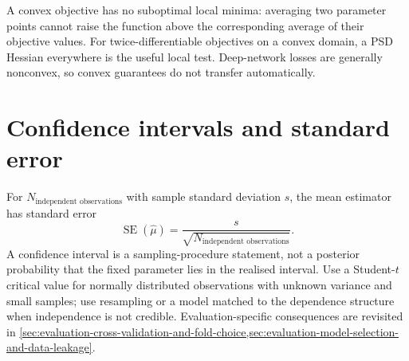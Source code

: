 A convex objective has no suboptimal local minima: averaging two parameter points cannot raise the function above the corresponding average of their objective values.
For twice-differentiable objectives on a convex domain, a PSD Hessian everywhere is the useful local test.
Deep-network losses are generally nonconvex, so convex guarantees do not transfer automatically.

\section{Confidence intervals and standard error}
\label{sec:foundations-confidence-intervals}

For $N_{\text{independent observations}}$ with sample standard deviation $s$, the mean estimator has standard error
\[
\operatorname{SE}(\hat\mu)=\frac{s}{\sqrt{N_{\text{independent observations}}}}.
\]
A confidence interval is a sampling-procedure statement, not a posterior probability that the fixed parameter lies in the realised interval.
Use a Student-$t$ critical value for normally distributed observations with unknown variance and small samples; use resampling or a model matched to the dependence structure when independence is not credible.
Evaluation-specific consequences are revisited in \cref{sec:evaluation-cross-validation-and-fold-choice,sec:evaluation-model-selection-and-data-leakage}.

